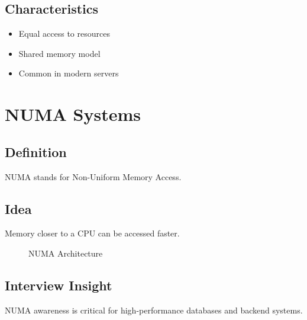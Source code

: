 \subsection{Characteristics}

\begin{itemize}
\item Equal access to resources
\item Shared memory model
\item Common in modern servers
\end{itemize}

\section{NUMA Systems}

\subsection{Definition}

NUMA stands for Non-Uniform Memory Access.

\subsection{Idea}

Memory closer to a CPU can be accessed faster.

\begin{figure}[h]
\centering
{}
\caption{NUMA Architecture}
\end{figure}

\subsection{Interview Insight}

NUMA awareness is critical for high-performance databases and backend systems.


